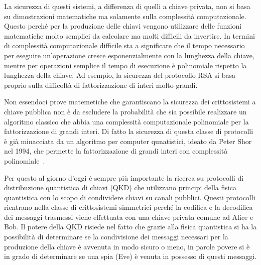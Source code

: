 La sicurezza di questi sistemi, a differenza di quelli a chiave privata, non si basa su dimostrazioni matematiche ma solamente sulla complessit\`a computazionale. Questo perch\'e per la produzione delle chiavi vengono utilizzare delle funzioni matematiche molto semplici da calcolare ma molti difficili da invertire. In termini di complessit\`a computazionale difficile sta a significare che il tempo necessario per eseguire un'operazione cresce esponenzialmente con la lunghezza della chiave, mentre per operazioni semplice il tempo di esecuzione \`e polinomiale rispetto la lunghezza della chiave. Ad esempio, la sicurezza del protocollo RSA si basa proprio sulla difficolt\`a di fattorizzazione di interi molto grandi.

Non essendoci prove matemetiche che garantiscano la sicurezza dei crittosistemi a chiave pubblica non \`e da escludere la probabilit\`a che sia possibile realizzare un algoritmo classico che abbia una complessit\`a computazionale polinomiale per la fattorizzazione di grandi interi. Di fatto la sicurezza di questa classe di protocolli \`e gi\`a minacciata da un algoritmo per computer qunatistici, ideato da Peter Shor nel 1994, che permette la fattorizzazione di grandi interi con complessit\`a polinomiale~\cite{365700}.

Per questo al giorno d'oggi \`e sempre pi\`u importante la ricerca su protocolli di distribuzione quantistica di chiavi (QKD) che utilizzano principi della fisica quantistica con lo scopo di condividere chiavi su canali pubblici. Questi protocolli rientrano nella classe di crittosistemi simmetrici perch\'e la codifica e la decodifica dei messaggi trasmessi viene effettuata con una chiave privata comune ad Alice e Bob. Il potere della QKD risiede nel fatto che grazie alla fisica quantistica si ha la possibilit\`a di determinare se la condivisione dei messaggi necessari per la produzione della chiave \`e avvenuta in modo sicuro o meno, in parole povere si \`e in grado di determinare se una spia (Eve) \`e venuta in possesso di questi messaggi.

